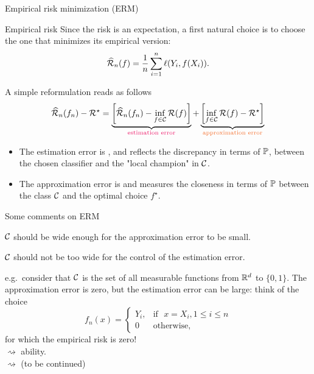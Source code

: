 \documentclass[xcolor={usenames,dvipsnames},handout]{beamer}
\begin{document}
\begin{frame}{Empirical risk minimization (ERM)}
\begin{exampleblock}{Empirical risk}
Since the risk is an expectation, a first natural choice is to choose the one that minimizes its empirical version:
$$
\widehat{\Rc}_n (f) = \frac{1}{n} \sum_{i=1}^n \ell (Y_i, f(X_i)).
$$
\end{exampleblock}
\pause
 A simple reformulation reads as follows
 $$
 \widehat{\Rc}_n(f_n) - \Rc^\star = \underbrace{\left[ \widehat{\Rc}_n(f_n) - \inf_{f\in \Cc} \Rc(f) \right]}_{\color{WildStrawberry}\text{estimation error}}+ \underbrace{\left[\inf_{f\in \Cc} \Rc(f) - \Rc^\star \right]}_{\color{Orange}\text{approximation error}}
 $$
 \pause
 {\small
 \begin{itemize}
 \item  The estimation error is , and reflects the discrepancy in terms of $\P$, between the chosen classifier and the "local champion" in $\Cc$.
\item The approximation error is  and measures the closeness in terms of $\P$ between the class $\Cc$ and the optimal choice $f^\star$.
\end{itemize}
}
\end{frame}
 

 

 

\begin{frame}{Some comments on ERM}

$\Cc$ should \alert{be wide enough for the approximation error to be small}.

\vspace{.2cm}

$\Cc$ should not be \alert{too wide for the control of the estimation error}.

\vspace{.2cm}

e.g.\ consider that $\Cc$ is the set of all measurable functions from $\R^d$ to $\{0,1\}$. 
The approximation error is zero, but the estimation error can be large: think of the choice
$$
f_n(x) = \left\{
\begin{array}{ll}
Y_i,  & \text{if } \, \,  x= X_i, 1\leq i \leq n \\
0 & \text{otherwise},
\end{array}
\right.
$$
for which the empirical risk is zero! \\
$\rightsquigarrow$  ability. \\
$\rightsquigarrow$  (to be continued)
\end{frame}
\end{document}
